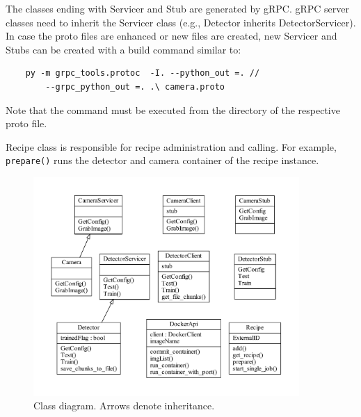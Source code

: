 The classes ending with Servicer and Stub are generated by gRPC. gRPC server classes need to inherit the Servicer class (e.g., Detector inherits DetectorServicer). In case the proto files are enhanced or new files are created, new Servicer and Stubs can be created with a build command similar to:

\begin{verbatim}
    py -m grpc_tools.protoc  -I. --python_out =. //
        --grpc_python_out =. .\ camera.proto
\end{verbatim}

Note that the command must be executed from the directory of the respective proto file. 

Recipe class is responsible for recipe administration and calling. For example, \texttt{prepare()} runs the detector and camera container of the recipe instance.
\begin{figure}[ht]
	\centering
  \includegraphics[width=0.9\textwidth]{img/classes.pdf}
	\caption[Class diagram]{Class diagram. Arrows denote inheritance.}
	\label{fig:Classes}
\end{figure}

